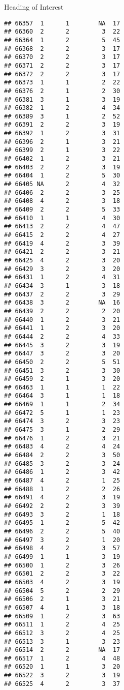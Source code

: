 \documentclass[
  ignorenonframetext,
]{beamer}
\begin{document}
\begin{frame}[fragile]{Heading of Interest}
\begin{verbatim}
## 66357  1      1        NA  17
## 66360  2      2         3  22
## 66364  1      2         5  45
## 66368  2      2         3  17
## 66370  2      2         3  17
## 66371  2      2         3  17
## 66372  2      2         3  17
## 66373  1      1         2  22
## 66376  2      1         2  30
## 66381  3      1         3  19
## 66382  1      2         4  34
## 66389  3      1         2  52
## 66391  2      2         3  19
## 66392  1      2         3  31
## 66396  2      1         3  21
## 66399  2      1         3  22
## 66402  1      2         3  21
## 66403  2      2         3  19
## 66404  1      2         5  30
## 66405 NA      2         4  32
## 66406  2      2         3  25
## 66408  4      2         3  18
## 66409  2      2         5  33
## 66410  1      1         4  30
## 66413  2      2         4  47
## 66415  2      2         4  27
## 66419  4      2         3  39
## 66421  2      2         3  21
## 66425  4      2         3  20
## 66429  3      2         3  20
## 66431  1      2         4  31
## 66434  3      1         3  18
## 66437  2      2         3  29
## 66438  3      2        NA  16
## 66439  2      2         2  20
## 66440  1      2         3  21
## 66441  1      2         3  20
## 66444  2      2         4  33
## 66445  3      2         3  19
## 66447  3      2         3  20
## 66450  2      2         5  51
## 66451  3      2         3  30
## 66459  2      1         3  20
## 66463  1      1         1  22
## 66464  3      1         1  18
## 66469  1      1         2  34
## 66472  5      1         1  23
## 66474  3      2         3  23
## 66475  3      1         2  29
## 66476  1      2         3  21
## 66483  4      2         4  24
## 66484  2      2         3  50
## 66485  3      2         3  24
## 66486  1      2         3  42
## 66487  4      2         1  25
## 66488  1      2         2  26
## 66491  4      2         3  19
## 66492  2      2         3  39
## 66493  3      2         1  18
## 66495  1      2         5  42
## 66496  2      2         5  40
## 66497  3      2         1  20
## 66498  4      2         3  57
## 66499  1      1         3  19
## 66500  1      2         3  26
## 66501  2      2         3  22
## 66503  4      2         3  19
## 66504  5      2         2  29
## 66506  2      1         3  21
## 66507  4      1         3  18
## 66509  1      2         3  63
## 66511  1      2         4  25
## 66512  3      2         4  25
## 66513  3      1         3  23
## 66514  2      2        NA  17
## 66517  1      2         4  48
## 66520  1      1         3  20
## 66522  3      2         3  19
## 66525  4      2         3  37

\end{verbatim}
\end{frame}
\end{document}
